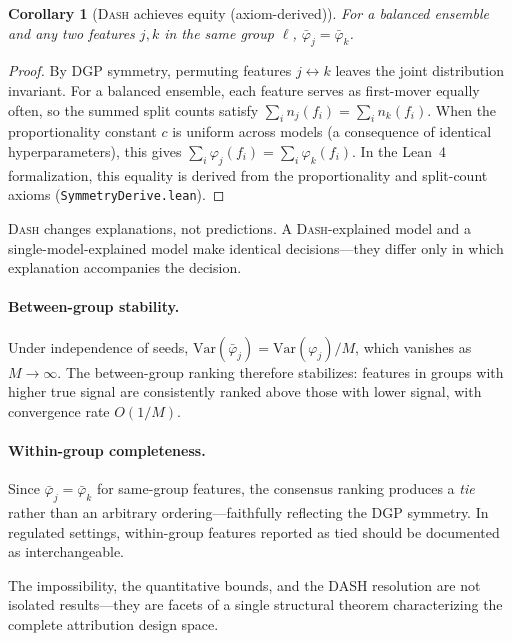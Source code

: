 \documentclass{article}
\newtheorem{corollary}[theorem]{Corollary}
\newcommand{\Var}{\mathrm{Var}}
\newcommand{\DASH}{\textsc{Dash}}
\begin{document}
\begin{corollary}[\DASH{} achieves equity (axiom-derived)]
\label{cor:equity}
For a balanced ensemble and any two features $j, k$ in the same group $\ell$,
$\bar{\varphi}_j = \bar{\varphi}_k$.
\end{corollary}

\begin{proof}
By DGP symmetry, permuting features $j \leftrightarrow k$ leaves the joint distribution invariant.
For a balanced ensemble, each feature serves as first-mover equally often, so the summed split counts satisfy $\sum_i n_j(f_i) = \sum_i n_k(f_i)$.
When the proportionality constant $c$ is uniform across models (a consequence of identical hyperparameters), this gives $\sum_i \varphi_j(f_i) = \sum_i \varphi_k(f_i)$.
In the Lean~4 formalization, this equality is derived from the proportionality and split-count axioms (\texttt{SymmetryDerive.lean}).
\end{proof}

\DASH{} changes explanations, not predictions. A \DASH{}-explained model and a single-model-explained model make identical decisions---they differ only in which explanation accompanies the decision.

\paragraph{Between-group stability.}
Under independence of seeds, $\Var(\bar{\varphi}_j) = \Var(\varphi_j) / M$, which vanishes as $M \to \infty$.
The between-group ranking therefore stabilizes: features in groups with higher true signal are consistently ranked above those with lower signal, with convergence rate $O(1/M)$.

\paragraph{Within-group completeness.}
Since $\bar{\varphi}_j = \bar{\varphi}_k$ for same-group features, the consensus ranking produces a \emph{tie} rather than an arbitrary ordering---faithfully reflecting the DGP symmetry.
In regulated settings, within-group features reported as tied should be documented as interchangeable.

The impossibility, the quantitative bounds, and the DASH resolution are not isolated results---they are facets of a single structural theorem characterizing the complete attribution design space.

\end{document}
